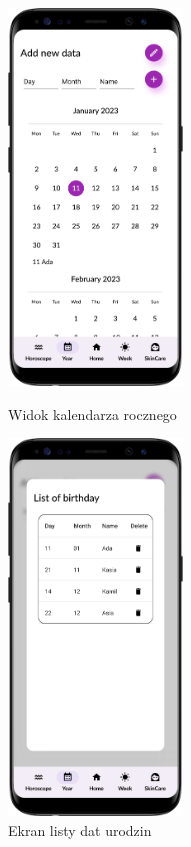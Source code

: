 \begin{figure}[t]
	\begin{minipage}{0.4\textwidth}
		\centering
		\includegraphics[height=10cm, keepaspectratio]{images/interfejs_figma/Year}
		\caption{Widok kalendarza rocznego}
		\label{fig:Year}
	\end{minipage}
	\hfill
	\begin{minipage}{0.4\textwidth}
		\centering
		\includegraphics[height=10cm,           keepaspectratio]{images/interfejs_figma/Birthday-Edit}
		\caption{Ekran listy dat urodzin}
		\label{fig:Birthday}
	\end{minipage}
\end{figure}

